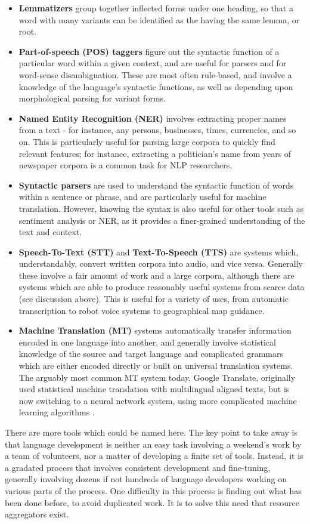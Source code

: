 \begin{itemize}
  \item \textbf{Lemmatizers} group together inflected forms under one heading, so that a word with many variants can be identified as the having the same lemma, or root.
  \item \textbf{Part-of-speech (POS) taggers} figure out the syntactic function of a particular word within a given context, and are useful for parsers and for word-sense disambiguation. These are most often rule-based, and involve a knowledge of the language's syntactic functions, as well as depending upon morphological parsing for variant forms.
  \item \textbf{Named Entity Recognition (NER)} involves extracting proper names from a text - for instance, any persons, businesses, times, currencies, and so on. This is particularly useful for parsing large corpora to quickly find relevant features; for instance, extracting a politician's name from years of newspaper corpora is a common task for NLP researchers.
  \item \textbf{Syntactic parsers} are used to understand the syntactic function of words within a sentence or phrase, and are particularly useful for machine translation. However, knowing the syntax is also useful for other tools such as sentiment analysis or NER, as it provides a finer-grained understanding of the text and context.
  \item \textbf{Speech-To-Text (STT)} and \textbf{Text-To-Speech (TTS)} are systems which, understandably, convert written corpora into audio, and vice versa. Generally these involve a fair amount of work and a large corpora, although there are systems which are able to produce reasonably useful systems from scarce data (see discussion above). This is useful for a variety of uses, from automatic transcription to robot voice systems to geographical map guidance.
  \item \textbf{Machine Translation (MT)} systems automatically transfer information encoded in one language into another, and generally involve statistical knowledge of the source and target language and complicated grammars which are either encoded directly or built on universal translation systems. The arguably most common MT system today, Google Translate, originally used statistical machine translation with multilingual aligned texts, but is now switching to a neural network system, using more complicated machine learning algorithms \citep{google2016google}.
\end{itemize}

There are more tools which could be named here. The key point to take away is that language development is neither an easy task involving a weekend's work by a team of volunteers, nor a matter of developing a finite set of tools. Instead, it is a gradated process that involves consistent development and fine-tuning, generally involving dozens if not hundreds of language developers working on various parts of the process. One difficulty in this process is finding out what has been done before, to avoid duplicated work. It is to solve this need that resource aggregators exist.


